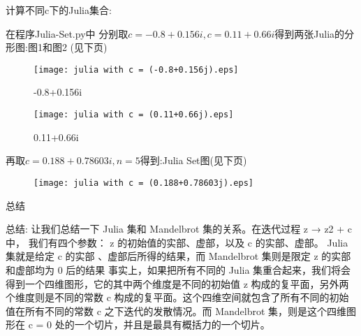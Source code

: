 \documentclass{beamer}
\begin{document}
\begin{frame}{计算不同c下的Julia集合:}
  
  在程序Julia-Set.py中
  分别取$c =-0.8+0.156i,c = 0.11+0.66i$得到两张Julia的分形图:图1和图2 (见下页)
\end{frame}
\begin{frame}{}
  \begin{figure}[htbp]
    \centering
    \begin{minipage}[t]{0.48\textwidth}
    \centering
    \texttt{[image: julia with c = (-0.8+0.156j).eps]}
    \caption{-0.8+0.156i}
    \end{minipage}
    \begin{minipage}[t]{0.48\textwidth}
    \centering
    \texttt{[image: julia with c = (0.11+0.66j).eps]}
    \caption{0.11+0.66i}
    \end{minipage}
\end{figure}
\end{frame}
\begin{frame}
再取$c = 0.188+0.78603i , n = 5$得到:Julia Set图(见下页)
\begin{figure}[h]
    \centering
    \texttt{[image: julia with c = (0.188+0.78603j).eps]}

\end{figure}
\end{frame}

\begin{frame}{总结}

  总结: 
  让我们总结一下 Julia 集和 Mandelbrot 集的关系。在迭代过程 z → z2 + c 中，
  我们有四个参数： z 的初始值的实部、虚部，以及 c 的实部、虚部。 Julia 集就是给定 c 的实部
  、虚部后所得的结果，而 Mandelbrot 集则是限定 z 的实部和虚部均为 0 后的结果
  事实上，如果把所有不同的 Julia 集重合起来，我们将会得到一个四维图形，它的其中两个维度是不同的初始值
   z 构成的复平面，另外两个维度则是不同的常数 c 构成的复平面。这个四维空间就包含了所有不同的初始值在所有不同的常数
    c 之下迭代的发散情况。而 Mandelbrot 集，则是这个四维图形在 c = 0 处的一个切片，并且是最具有概括力的一个切片。
  \cite{second}
\end{frame}
\begin{frame}
  
  
\end{frame}
\end{document}
